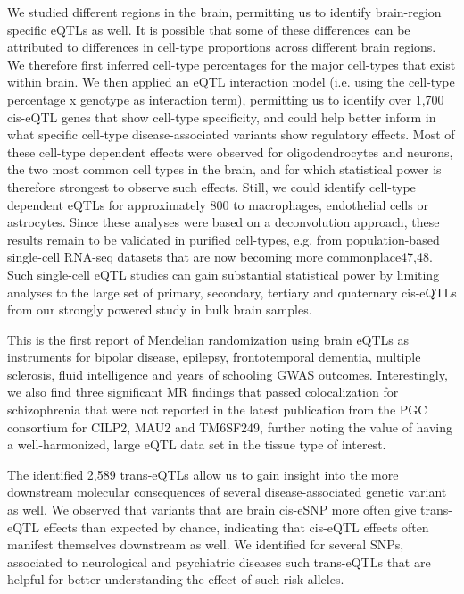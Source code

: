 We studied different regions in the brain, permitting us to identify brain-region specific eQTLs as well. It is possible that some of these differences can be attributed to differences in cell-type proportions across different brain regions. We therefore first inferred cell-type percentages for the major cell-types that exist within brain. We then applied an eQTL interaction model (i.e. using the cell-type percentage x genotype as interaction term), permitting us to identify over 1,700 cis-eQTL genes that show cell-type specificity, and could help better inform in what specific cell-type disease-associated variants show regulatory effects. Most of these cell-type dependent effects were observed for oligodendrocytes and neurons, the two most common cell types in the brain, and for which statistical power is therefore strongest to observe such effects. Still, we could identify cell-type dependent eQTLs for approximately 800 to macrophages, endothelial cells or astrocytes. Since these analyses were based on a deconvolution approach, these results remain to be validated in purified cell-types, e.g. from population-based single-cell RNA-seq datasets that are now becoming more commonplace47,48. Such single-cell eQTL studies can gain substantial statistical power by limiting analyses to the large set of primary, secondary, tertiary and quaternary cis-eQTLs from our strongly powered study in bulk brain samples. 



This is the first report of Mendelian randomization using brain eQTLs as instruments for bipolar disease, epilepsy, frontotemporal dementia, multiple sclerosis, fluid intelligence and years of schooling GWAS outcomes. Interestingly, we also find three significant MR findings that passed colocalization for schizophrenia that were not reported in the latest publication from the PGC consortium for CILP2, MAU2 and TM6SF249, further noting the value of having a well-harmonized, large eQTL data set in the tissue type of interest.  



The identified 2,589 trans-eQTLs allow us to gain insight into the more downstream molecular consequences of several disease-associated genetic variant as well. We observed that variants that are brain cis-eSNP more often give trans-eQTL effects than expected by chance, indicating that cis-eQTL effects often manifest themselves downstream as well. We identified for several SNPs, associated to neurological and psychiatric diseases such trans-eQTLs that are helpful for better understanding the effect of such risk alleles. 



